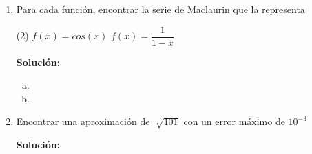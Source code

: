 \documentclass[12pt]{article}
\newenvironment{solucion}
{\begin{mdframed}[backgroundcolor=black!10]
		{\bf Solución:}\\
	}
	{
	\end{mdframed}
}
\newenvironment{preguntas}
{\begin{enumerate}\itemsep12pt
	}
	{
	\end{enumerate}
}
\begin{document}
\begin{preguntas}
\begin{solucion}
Integramos,
$$\int f(x)dx 
= \sum\limits_{n=2}^{\infty}\dfrac{\cancel{n}(n+1)}{3^{n-1}} \dfrac{x^n}{\cancel{n}} 
= \sum\limits_{n=2}^{\infty}\dfrac{n+1}{3^{n-1}} x^n$$
Integramos  nuevamente,
$$\iint f(x)dxdx 
= \sum\limits_{n=2}^{\infty}\dfrac{\cancel{n+1}}{3^{n-1}} \dfrac{x^{n+1}}{\cancel{n+1}} 
= \sum\limits_{n=2}^{\infty}\dfrac{x^{n+1}}{3^{n-1}}$$
Notemos que
$$\sum\limits_{n=2}^{\infty}\dfrac{x^{n+1}}{3^{n-1}}
= \sum\limits_{n=0}^{\infty}\dfrac{x^{n+3}}{3^{n+1}}
= \dfrac{x^3}{3}\sum\limits_{n=0}^{\infty}\left(\dfrac{x}{3}\right)^n
= \dfrac{x^3}{3}\dfrac{1}{1-\dfrac{x}{3}}
= \dfrac{x^3}{3-x}$$
Por lo que
$$\iint f(x)dxdx 
= \dfrac{x^3}{3-x}$$
Derivamos,
$$\int f(x)dx
= \left(\dfrac{x^3}{3-x}\right)' 
= \dfrac{9x^2-2x^3}{(3-x)^2}
$$
Derivamos nuevamente,
$$f(x)
= \left(\dfrac{9x^2-2x^3}{(3-x)^2}\right)' 
= \dfrac{(18x-6x^2)(3-x)^2 + 2(3-x)(9x^2-2x^3)}{(3-x)^4}
$$
Finalmente,
$$f(1)
= \dfrac{(18-6)(3-1)^2 + 2(3-1)(9-2)}{(3-1)^4}
=\dfrac{19}{4}
$$
Por lo que
$$ \sum\limits_{n=2}^{\infty}\dfrac{n(n+1)}{3^{n-1}} 
=\dfrac{19}{4}$$
\end{solucion}
\item Para cada función, encontrar la serie de Maclaurin que la representa
\begin{tasks}(2)
\task $f(x) = cos(x)$
\task $f(x) = \dfrac{1}{1-x}$
\end{tasks}
\begin{solucion}

\begin{enumerate}[a)]
\item 
\item 
\end{enumerate}
\end{solucion}
\item Encontrar una aproximación de $\sqrt[]{101}$ con un error máximo de $10^{-3}$
\begin{solucion}

\end{solucion}
\end{preguntas}
\end{document}
